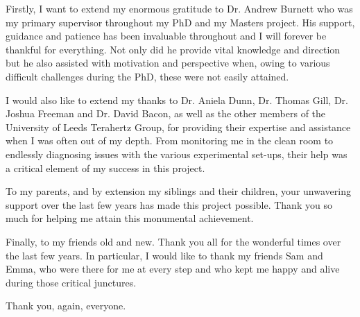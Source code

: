 Firstly, I want to extend my enormous gratitude to Dr. Andrew Burnett who was my primary supervisor throughout my PhD and my Masters project. His support, guidance and patience has been invaluable throughout and I will forever be thankful for everything. Not only did he provide vital knowledge and direction but he also assisted with motivation and perspective when, owing to various difficult challenges during the PhD, these were not easily attained.

I would also like to extend my thanks to Dr. Aniela Dunn, Dr. Thomas Gill, Dr. Joshua Freeman and Dr. David Bacon, as well as the other members of the University of Leeds Terahertz Group, for providing their expertise and assistance when I was often out of my depth. From monitoring me in the clean room to endlessly diagnosing issues with the various experimental set-ups, their help was a critical element of my success in this project.

To my parents, and by extension my siblings and their children, your unwavering support over the last few years has made this project possible. Thank you so much for helping me attain this monumental achievement. 

Finally, to my friends old and new. Thank you all for the wonderful times over the last few years. In particular, I would like to thank my friends Sam and Emma, who were there for me at every step and who kept me happy and alive during those critical junctures. 

Thank you, again, everyone.
